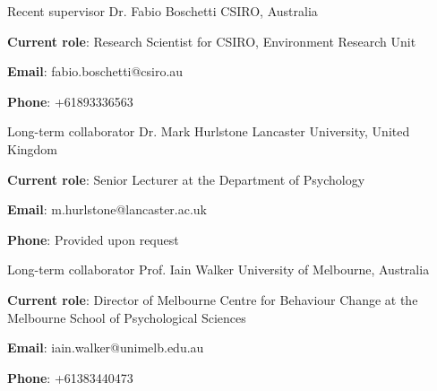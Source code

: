 

\begin{cventries}

  \cventry
    {Recent supervisor} %
    {Dr. Fabio Boschetti} %
    {CSIRO,}%
    {Australia} %
    {
      \begin{cvitems} %
        \item {\textbf{Current role}: Research Scientist for CSIRO, Environment Research Unit}
        \item {\textbf{Email}: fabio.boschetti@csiro.au}
        \item {\textbf{Phone}: +61893336563}
      \end{cvitems}
    }

  \cventry
    {Long-term collaborator} %
    {Dr. Mark Hurlstone} %
    {Lancaster University,}%
    {United Kingdom} %
    {
      \begin{cvitems} %
        \item {\textbf{Current role}: Senior Lecturer at the Department of Psychology}
        \item {\textbf{Email}: m.hurlstone@lancaster.ac.uk}
        \item {\textbf{Phone}: Provided upon request}
      \end{cvitems}
    }

  \cventry
    {Long-term collaborator} %
    {Prof. Iain Walker} %
    {University of Melbourne,} %
    {Australia} %
    {
      \begin{cvitems} %
        \item {\textbf{Current role}:  Director of Melbourne Centre for Behaviour Change at the Melbourne School of Psychological Sciences}
        \item {\textbf{Email}: iain.walker@unimelb.edu.au}
        \item {\textbf{Phone}: +61383440473}
      \end{cvitems}
    }
    

\end{cventries}


